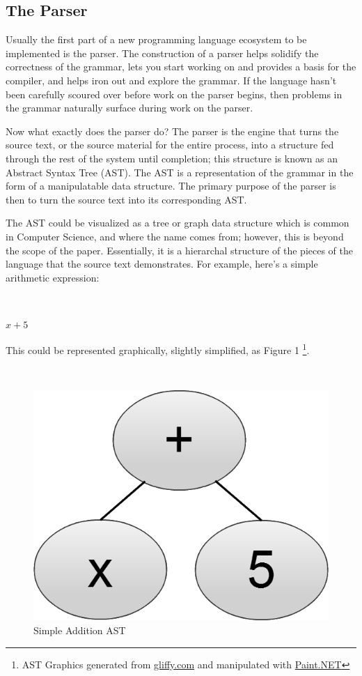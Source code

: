 \documentclass[titlepage]{article}
\begin{document}
		\subsection{The Parser}

			Usually the first part of a new programming language ecosystem to be implemented is the parser.  The construction of a parser helps solidify the correctness of the grammar, lets you start working on and provides a basis for the compiler, and helps iron out and explore the grammar.  If the language hasn't been carefully scoured over before work on the parser begins, then problems in the grammar naturally surface during work on the parser.

			Now what exactly does the parser do?  The parser is the engine that turns the source text, or the source material for the entire process, into a structure fed through the rest of the system until completion; this structure is known as an Abstract Syntax Tree (AST).  The AST is a representation of the grammar in the form of a manipulatable data structure.  The primary purpose of the parser is then to turn the source text into its corresponding AST.

			The AST could be visualized as a tree or graph data structure which is common in Computer Science, and where the name comes from; however, this is beyond the scope of the paper.  Essentially, it is a hierarchal structure of the pieces of the language that the source text demonstrates.  For example, here's a simple arithmetic expression:
			\newline

			~\centerline{\Large{$x + 5$}}
			\newline

			This could be represented graphically, slightly simplified, as Figure 1
			\footnote{AST Graphics generated from \href{http://www.gliffy.com}{gliffy.com} and manipulated with \href{http://www.getpaint.net/}{Paint.NET}}.
			\newline

			\begin{figure}
				\caption{Simple Addition AST}
				~\centerline{\includegraphics[scale=.3]{ExampleSimpleAST.png}}
			\end{figure}
\end{document}
